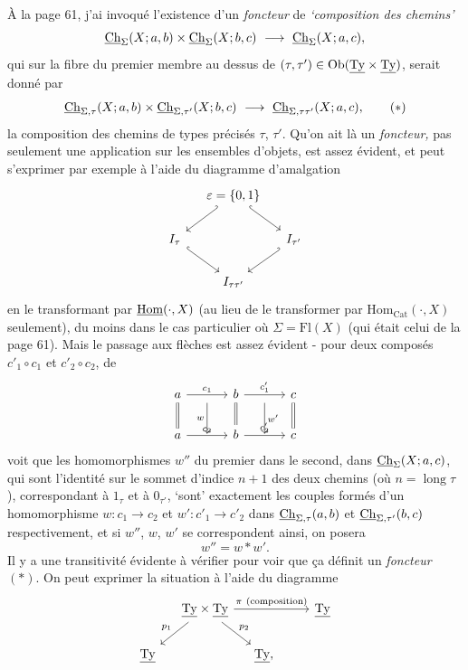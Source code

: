 À la page 61, j'ai invoqué l'existence d'un \textit{foncteur} de \textit{`composition des chemins'}
\[
\Ch_{\Sigma}(X;a,b)\times\Ch_{\Sigma}(X;b,c) \ \longrightarrow\ \Ch_{\Sigma}(X;a,c),
\]
qui sur la fibre du premier membre au dessus de $(\tau,\tau') \in \operatorname{Ob}(\underline{\mathrm{Ty}}\times\underline{\mathrm{Ty}})$, serait donné par
\[
\underline{\mathrm{Ch}}_{\Sigma,\tau}(X;a,b)\times\underline{\mathrm{Ch}}_{\Sigma,\tau'}(X;b,c) \ \longrightarrow\ \underline{\mathrm{Ch}}_{\Sigma,\tau\tau'}(X;a,c), \tag*{$(*)$}
\]
la composition des chemins de types précisés $\tau$, $\tau'$. Qu'on ait là un \textit{foncteur,} pas seulement une application sur les ensembles d'objets, est assez évident, et peut s'exprimer par exemple à l'aide du diagramme d'amalgation
\[
\begin{tikzcd}[column sep=small]
 & \varepsilon = \{0,1\} \ar[dl,hook'] \ar[dr,hook] & \\
I_{\tau} \ar[dr,hook] & & I_{\tau'} \ar[dl,hook'] \\
 & I_{\tau\tau'} &
\end{tikzcd}
\]
en le transformant par $\underline{\mathrm{Hom}}(\cdot,X)$ (au lieu de le transformer par $\mathrm{Hom}_{\mathrm{Cat}}(\cdot,X)$ seulement), du moins dans le cas particulier où $\Sigma = \mathrm{Fl}(X)$ (qui était celui de la page 61). Mais le passage aux flèches est assez évident - pour deux composés $c'_1\circ c_1$ et $c'_2\circ c_2$, de
\[
\begin{tikzcd}[column sep=small]
a \ar[rr,"c_1"] \ar[d,equal] & {} \ar[d,"w"'] & b \ar[rr,"c'_1"] \ar[d,equal] & {} \ar[d,"w'"] & c \ar[d,equal] \\
a \ar[rr,"c_2"] & {} & b \ar[rr,"c'_2"] & {} & c
\end{tikzcd}
\]
 voit que les homomorphismes $w''$ du premier dans le second, dans $\underline{\mathrm{Ch}}_{\Sigma}(X;a,c)$, qui sont l'identité sur le sommet d'indice $n+1$ des deux chemins (où $n = \operatorname{long}\tau$), correspondant à $1_{\tau}$ et à $0_{\tau'}$, `sont' exactement les couples
formés d'un homomorphisme $w : c_1 \longrightarrow c_2$ et $w' : c'_1 \longrightarrow c'_2$ dans $\underline{\mathrm{Ch}}_{\Sigma,\tau}(a,b)$ et $\underline{\mathrm{Ch}}_{\Sigma,\tau'}(b,c)$ respectivement, et si $w''$, $w$, $w'$ se correspondent ainsi, on posera
\[
w'' = w * w'.
\]
Il y a une transitivité évidente à vérifier pour voir que ça définit un \textit{foncteur} $(*)$. On peut exprimer la situation à l'aide du diagramme
\[
\begin{tikzcd}[column sep=small]
 & \Ty\times\Ty \ar[rrr,"\pi\ (\text{composition})"] \ar[dl,"p_1"'] \ar[dr,"p_2"] & & & \Ty \\
\Ty & & \Ty, & &
\end{tikzcd}
\]
